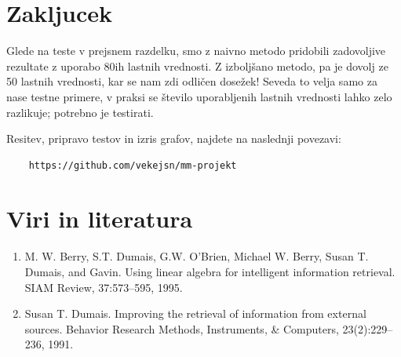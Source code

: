 \documentclass{article}
\begin{document}
\section{Zakljucek}
Glede na teste v prejsnem razdelku, smo z naivno metodo pridobili zadovoljive rezultate z uporabo 80ih lastnih vrednosti. Z izboljšano metodo, pa je dovolj ze 50 lastnih vrednosti, kar se nam zdi
odličen dosežek! Seveda to velja samo za nase testne primere, v praksi se število uporabljenih lastnih vrednosti lahko zelo razlikuje; potrebno je testirati.

Resitev, pripravo testov in izris grafov, najdete na naslednji povezavi: 
\begin{verbatim}
    https://github.com/vekejsn/mm-projekt
\end{verbatim}
\newpage

\section{Viri in literatura}
\begin{enumerate}
    \item  M. W. Berry, S.T. Dumais, G.W. O’Brien, Michael W. Berry, Susan T.
    Dumais, and Gavin. Using linear algebra for intelligent information retrieval.
    SIAM Review, 37:573–595, 1995.
    \item Susan T. Dumais. Improving the retrieval of information from external 
    sources. Behavior Research Methods, Instruments, \& Computers, 23(2):229–
    236, 1991.
\end{enumerate}
\end{document}
